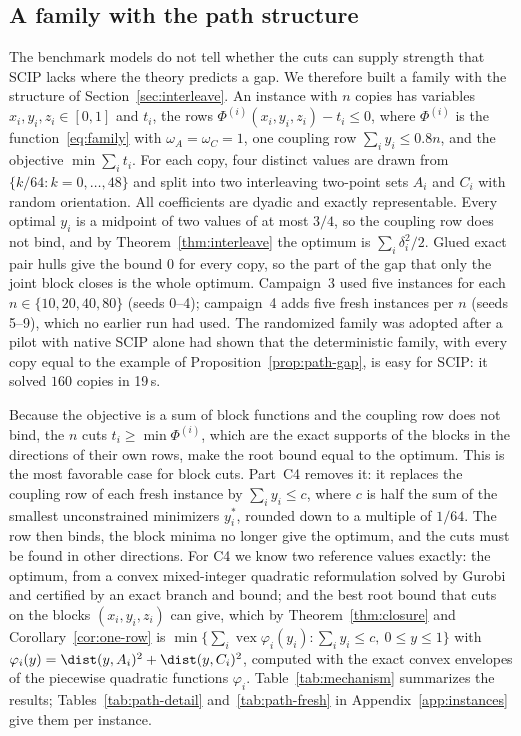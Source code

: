 \subsection{A family with the path structure}\label{sec:mechanism}

The benchmark models do not tell whether the cuts can supply strength that
SCIP lacks where the theory predicts a gap. We therefore built a family with
the structure of Section~\ref{sec:interleave}. An instance with $n$ copies has
variables $x_i,y_i,z_i\in[0,1]$ and $t_i$, the rows
$\Phi^{(i)}(x_i,y_i,z_i)-t_i\le0$, where $\Phi^{(i)}$ is the
function~\eqref{eq:family} with $\omega_A=\omega_C=1$, one coupling row
$\sum_iy_i\le0.8n$, and the objective $\min\sum_it_i$. For each copy, four
distinct values are drawn from $\{k/64:k=0,\dots,48\}$ and split into two
interleaving two-point sets $A_i$ and $C_i$ with random orientation. All
coefficients are dyadic and exactly representable. Every optimal $y_i$ is a
midpoint of two values of at most $3/4$, so the coupling row does not bind, and
by Theorem~\ref{thm:interleave} the optimum is $\sum_i\delta_i^2/2$. Glued exact
pair hulls give the bound $0$ for every copy, so the part of the gap that only
the joint block closes is the whole optimum. Campaign~3 used five instances for
each $n\in\{10,20,40,80\}$ (seeds 0--4); campaign~4 adds five fresh instances
per $n$ (seeds 5--9), which no earlier run had used. The randomized family was
adopted after a pilot with native SCIP alone had shown that the deterministic
family, with every copy equal to the example of
Proposition~\ref{prop:path-gap}, is easy for SCIP: it solved $160$ copies in
19\,s.

Because the objective is a sum of block functions and the coupling row does not
bind, the $n$ cuts $t_i\ge\min\Phi^{(i)}$, which are the exact supports of the
blocks in the directions of their own rows, make the root bound equal to the
optimum. This is the most favorable case for block cuts. Part~C4 removes it: it
replaces the coupling row of each fresh instance by $\sum_iy_i\le c$, where $c$
is half the sum of the smallest unconstrained minimizers $y_i^\ast$, rounded down
to a multiple of $1/64$. The row then binds, the block minima no longer give the
optimum, and the cuts must be found in other directions. For C4 we know two
reference values exactly: the optimum, from a convex mixed-integer quadratic
reformulation solved by Gurobi and certified by an exact branch and bound; and
the best root bound that cuts on the blocks $(x_i,y_i,z_i)$ can give, which by
Theorem~\ref{thm:closure} and Corollary~\ref{cor:one-row} is
$\min\{\sum_i\operatorname{vex}\varphi_i(y_i):\sum_iy_i\le c,\ 0\le y\le1\}$
with $\varphi_i(y)=\dist(y,A_i)^2+\dist(y,C_i)^2$, computed with the exact convex
envelopes of the piecewise quadratic functions $\varphi_i$.
Table~\ref{tab:mechanism} summarizes the results; Tables~\ref{tab:path-detail}
and~\ref{tab:path-fresh} in Appendix~\ref{app:instances} give them per
instance.


